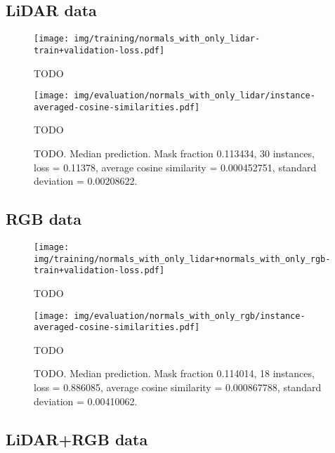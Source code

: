 \subsection{LiDAR data}

\begin{figure}[H]
  \texttt{[image: img/training/normals\_with\_only\_lidar-train+validation-loss.pdf]}
  \caption{TODO}
\end{figure}

\begin{figure}[H]
  \texttt{[image: img/evaluation/normals\_with\_only\_lidar/instance-averaged-cosine-similarities.pdf]}
  \caption{TODO}
\end{figure}

\begin{figure}[H]
  \caption{%
    TODO.
    Median prediction.
    Mask fraction \num{0.113434}, 30 instances, loss = \num{0.11378}, average cosine similarity = \num{0.000452751}, standard deviation = \num{0.00208622}.
  }
\end{figure}

\subsection{RGB data}

\begin{figure}[H]
  \texttt{[image: img/training/normals\_with\_only\_lidar+normals\_with\_only\_rgb-train+validation-loss.pdf]}
  \caption{TODO}
\end{figure}

\begin{figure}[H]
  \texttt{[image: img/evaluation/normals\_with\_only\_rgb/instance-averaged-cosine-similarities.pdf]}
  \caption{TODO}
\end{figure}

\begin{figure}[H]
  \caption{%
    TODO.
    Median prediction.
    Mask fraction \num{0.114014}, 18 instances, loss = \num{0.886085}, average cosine similarity = \num{0.000867788}, standard deviation = \num{0.00410062}.
  }
\end{figure}

\subsection{LiDAR+RGB data}

